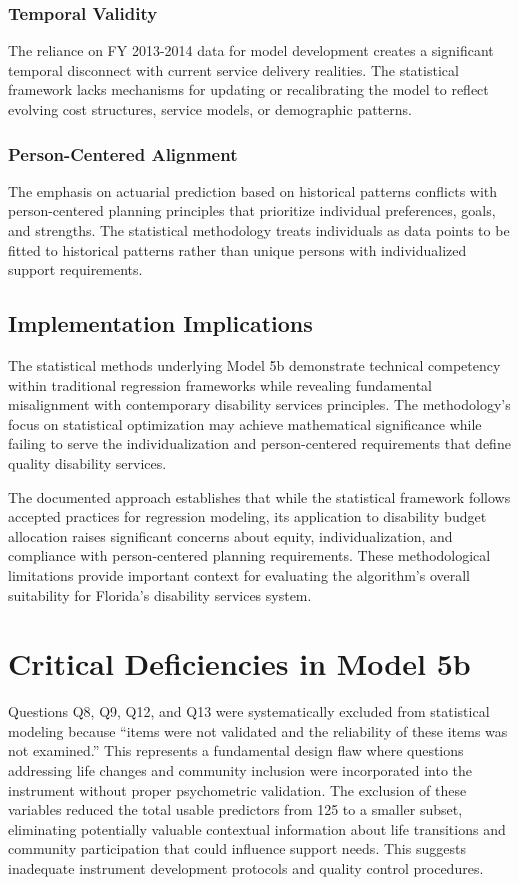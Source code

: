 \subsubsection{Temporal Validity}
The reliance on FY 2013-2014 data for model development creates a significant temporal disconnect with current service delivery realities. The statistical framework lacks mechanisms for updating or recalibrating the model to reflect evolving cost structures, service models, or demographic patterns.

\subsubsection{Person-Centered Alignment}
The emphasis on actuarial prediction based on historical patterns conflicts with person-centered planning principles that prioritize individual preferences, goals, and strengths. The statistical methodology treats individuals as data points to be fitted to historical patterns rather than unique persons with individualized support requirements.

\subsection{Implementation Implications}

The statistical methods underlying Model 5b demonstrate technical competency within traditional regression frameworks while revealing fundamental misalignment with contemporary disability services principles. The methodology's focus on statistical optimization may achieve mathematical significance while failing to serve the individualization and person-centered requirements that define quality disability services.

The documented approach establishes that while the statistical framework follows accepted practices for regression modeling, its application to disability budget allocation raises significant concerns about equity, individualization, and compliance with person-centered planning requirements. These methodological limitations provide important context for evaluating the algorithm's overall suitability for Florida's disability services system.

\section{Critical Deficiencies in Model 5b}
Questions Q8, Q9, Q12, and Q13 were systematically excluded from statistical modeling because ``items were not validated and the reliability of these items was not examined.'' This represents a fundamental design flaw where questions addressing life changes and community inclusion were incorporated into the instrument without proper psychometric validation. The exclusion of these variables reduced the total usable predictors from 125 to a smaller subset, eliminating potentially valuable contextual information about life transitions and community participation that could influence support needs. This suggests inadequate instrument development protocols and quality control procedures.


